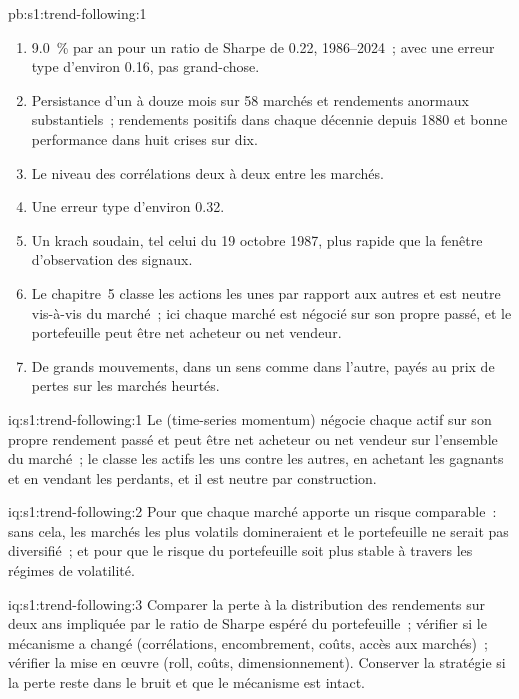 \begin{solution}{pb:s1:trend-following:1}
\begin{enumerate}
de 6.8~\%, 24.3~\% et 35.1~\%~; le ratio de Sharpe après coûts croît avec la vitesse, de $-0.00$ (un mois) à 0.66 (douze mois) pour les rendements passés,
0.10 à 0.72 pour les croisements et de 0.17 à 0.78 pour les cassures.
\item 9.0~\% par an pour un ratio de Sharpe de 0.22, 1986--2024~; avec une erreur type d'environ 0.16, pas grand-chose.
\item Persistance d'un à douze mois sur 58 marchés et rendements anormaux substantiels~; rendements positifs dans chaque décennie depuis 1880 et bonne
performance dans huit crises sur dix.
\item Le niveau des corrélations deux à deux entre les marchés.
\item Une erreur type d'environ 0.32.
\item Un krach soudain, tel celui du 19 octobre 1987, plus rapide que la fenêtre d'observation des signaux.
\item Le chapitre~5 classe les actions les unes par rapport aux autres et est neutre vis-à-vis du marché~; ici chaque marché est négocié sur son propre passé, et le portefeuille peut être net acheteur ou net vendeur.
\item De grands mouvements, dans un sens comme dans l'autre, payés au prix de pertes sur les marchés heurtés.
\end{enumerate}
\end{solution}

\begin{solution}{iq:s1:trend-following:1}
Le  (time-series momentum) négocie chaque actif sur son propre rendement passé et peut être net acheteur ou net vendeur sur l'ensemble du marché~; le  classe les actifs
les uns contre les autres, en achetant les gagnants et en vendant les perdants, et il est neutre par construction.
\end{solution}

\begin{solution}{iq:s1:trend-following:2}
Pour que chaque marché apporte un risque comparable~: sans cela, les marchés les plus volatils domineraient et le portefeuille ne serait pas diversifié~; et pour que le risque du portefeuille
soit plus stable à travers les régimes de volatilité.
\end{solution}

\begin{solution}{iq:s1:trend-following:3}
Comparer la perte à la distribution des rendements sur deux ans impliquée par le ratio de Sharpe espéré du portefeuille~; vérifier si le mécanisme a changé (corrélations,
encombrement, coûts, accès aux marchés)~; vérifier la mise en œuvre (roll, coûts, dimensionnement). Conserver la stratégie si la perte reste dans le bruit et que le mécanisme est intact.
\end{solution}

